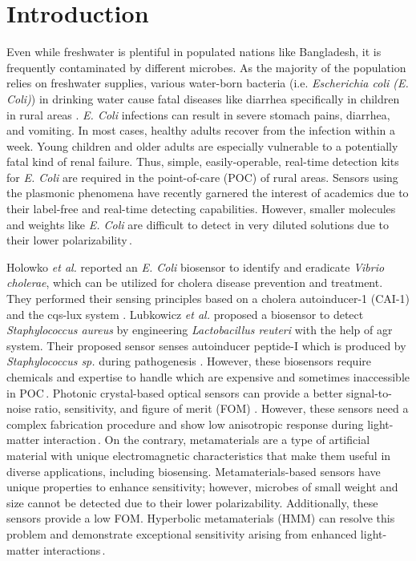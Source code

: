\documentclass[conference]{IEEEtran}
\begin{document}
\section{Introduction}
Even while freshwater is plentiful in populated nations like Bangladesh, it is frequently contaminated by different microbes. As the majority of the population relies on freshwater supplies, various water-born bacteria (i.e. \textit{Escherichia coli (E. Coli)}) in drinking water cause fatal diseases like diarrhea specifically in children in rural areas \cite{TOFAIL}. \textit{E. Coli} infections can result in severe stomach pains, diarrhea, and vomiting. In most cases, healthy adults recover from the infection within a week. Young children and older adults are especially vulnerable to a potentially fatal kind of renal failure. Thus, simple, easily-operable, real-time detection kits for \textit{E. Coli} are required in the point-of-care (POC) of rural areas. Sensors using the plasmonic phenomena have recently garnered the interest of academics due to their label-free and real-time detecting capabilities. However, smaller molecules and weights like \textit{E. Coli} are difficult to detect in very diluted solutions due to their lower polarizability\,\cite{Yan}. 

Holowko \textit{et al.} reported an \textit{E. Coli} biosensor to identify and eradicate \textit{Vibrio cholerae}, which can be utilized for cholera disease prevention and treatment. They performed their sensing principles based on a cholera autoinducer-1 (CAI-1) and the cqs-lux system \cite{Ho}. Lubkowicz \textit{et al.} proposed a biosensor to detect \textit{Staphylococcus aureus} by engineering \textit{Lactobacillus reuteri} with the help of agr system. Their proposed sensor senses autoinducer peptide-I which is produced by \textit{Staphylococcus sp.} during pathogenesis \cite{prem}. However, these biosensors require chemicals and expertise to handle which are expensive and sometimes inaccessible in POC\,\cite{ying}. Photonic crystal-based optical sensors can provide a better signal-to-noise ratio, sensitivity, and figure of merit (FOM) \cite{sharma}. However, these sensors need a complex fabrication procedure and show low anisotropic response during light-matter interaction\,\cite{Chowdhury}. On the contrary, metamaterials are a type of artificial material with unique electromagnetic characteristics that make them useful in diverse applications, including biosensing. Metamaterials-based sensors have unique properties to enhance sensitivity; however, microbes of small weight and size cannot be detected due to their lower polarizability. Additionally, these sensors provide a low FOM. Hyperbolic metamaterials (HMM) can resolve this problem and demonstrate exceptional sensitivity arising from enhanced light-matter interactions\,\cite{Gao}.
\end{document}

